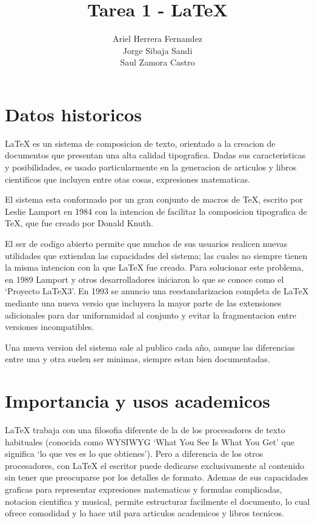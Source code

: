 \documentclass[11pt]{article}
\title{\textbf{Tarea 1 - \LaTeX{}}}
\author{Ariel Herrera Fernandez\\Jorge Sibaja Sandi\\Saul Zamora Castro}
\date{}
\begin{document}
\maketitle

\newpage

\tableofcontents

\newpage

\section{Datos historicos}
\LaTeX{} es un sistema de composicion de texto, orientado a la creacion de documentos que presentan una alta calidad tipografica. Dadas sus caracteristicas y posibilidades, es usado particularmente en la generacion de articulos y libros cientificos que incluyen entre otas cosas, expresiones matematicas.

El sistema esta conformado por un gran conjunto de macros de TeX, escrito por Leslie Lamport en 1984 con la intencion de facilitar la composicion tipografica de TeX, que fue creado por Donald Knuth.

El ser de codigo abierto permite que muchos de sus usuarios realicen nuevas utilidades que extiendan las capacidades del sistema; las cuales no siempre tienen la misma intencion con la que \LaTeX{} fue creado. Para solucionar este problema, en 1989 Lamport y otros desarrolladores iniciaron lo que se conoce como el `Proyecto LaTeX3'. En 1993 se anuncio una reestandarizacion completa de \LaTeX{} mediante una nueva versio que incluyera la mayor parte de las extensiones adicionales para dar uniformmidad al conjunto y evitar la fragmentacion entre versiones incompatibles.

Una nueva version del sistema sale al publico cada año, aunque las diferencias entre una y otra suelen ser minimas, siempre estan bien documentadas.

\section{Importancia y usos academicos}
\LaTeX{} trabaja con una filosofia diferente de la de los procesadores de texto habituales (conocida como WYSIWYG `What You See Is What You Get' que significa `lo que ves es lo que obtienes'). Pero a diferencia de los otros procesadores, con \LaTeX{} el escritor puede dedicarse exclusivamente al contenido sin tener que preocuparse por los detalles de formato. Ademas de sus capacidades graficas para representar expresiones matematicas y formulas complicadas, notacion cientifica y musical, permite estructurar facilmente el documento, lo cual ofrece comodidad y lo hace util para articulos academicos y libros tecnicos.
\end{document}
